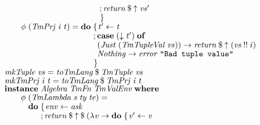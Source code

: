 \documentclass[10pt]{article}
\newcommand{\Conid}[1]{\mathit{#1}}
\newcommand{\Varid}[1]{\mathit{#1}}
\begin{document}
\begin{tabbing}
${\hskip1.00em\relax\hskip2.00em\relax\phantom{\Varid{\phi}\;(\Conid{TmTuple}\;\Varid{vs})\mathrel{=}\mathbf{do}\;\mbox{}};\Varid{return}\mathbin{\$}\Varid{\uparrow}\;\Varid{vs'}}$\\
${\hskip1.00em\relax\hskip2.00em\relax\phantom{\Varid{\phi}\;(\Conid{TmTuple}\;\Varid{vs})\mathrel{=}\mathbf{do}\;\mbox{}}\mskip1.5mu\}}$\\
${}$\\
${\hskip1.00em\relax\hskip2.00em\relax\Varid{\phi}\;(\Conid{TmPrj}\;\Varid{i}\;\Varid{t})\mathrel{=}\mathbf{do}\;\{\mskip1.5mu \Varid{t'}\leftarrow \Varid{t}}$\\
${\hskip1.00em\relax\hskip2.00em\relax\phantom{\Varid{\phi}\;(\Conid{TmPrj}\;\Varid{i}\;\Varid{t})\mathrel{=}\mathbf{do}\;\mbox{}};\mathbf{case}\;(\Varid{\downarrow}\;\Varid{t'})\;\mathbf{of}}$\\
${\hskip1.00em\relax\hskip2.00em\relax\phantom{\Varid{\phi}\;(\Conid{TmPrj}\;\Varid{i}\;\Varid{t})\mathrel{=}\mathbf{do}\;\mbox{}}\phantom{;\mbox{}}(\Conid{Just}\;(\Conid{TmTupleVal}\;\Varid{vs}))\to \Varid{return}\mathbin{\$}\Varid{\uparrow}\;(\Varid{vs}\mathbin{!!}\Varid{i})}$\\
${\hskip1.00em\relax\hskip2.00em\relax\phantom{\Varid{\phi}\;(\Conid{TmPrj}\;\Varid{i}\;\Varid{t})\mathrel{=}\mathbf{do}\;\mbox{}}\phantom{;\mbox{}}\Conid{Nothing}\to \Varid{error}\;\text{\tt \char34 Bad~tuple~value\char34}}$\\
${\hskip1.00em\relax\hskip2.00em\relax\phantom{\Varid{\phi}\;(\Conid{TmPrj}\;\Varid{i}\;\Varid{t})\mathrel{=}\mathbf{do}\;\mbox{}}\mskip1.5mu\}}$\\
${}$\\
${\hskip1.00em\relax\Varid{mkTuple}\;\Varid{vs}\mathrel{=}\Varid{toTmLang}\mathbin{\$}\Conid{TmTuple}\;\Varid{vs}}$\\
${\hskip1.00em\relax\Varid{mkTmPrj}\;\Varid{i}\;\Varid{t}\mathrel{=}\Varid{toTmLang}\mathbin{\$}\Conid{TmPrj}\;\Varid{i}\;\Varid{t}}$\\
${}$\\
${\hskip1.00em\relax\mathbf{instance}\;\Conid{Algebra}\;\Conid{TmFn}\;\Conid{TmValEnv}\;\mathbf{where}}$\\
${\hskip1.00em\relax\hskip2.00em\relax\Varid{\phi}\;(\Conid{TmLambda}\;\Varid{s}\;\Varid{ty}\;\Varid{te})\mathrel{=}}$\\
${\hskip1.00em\relax\hskip2.00em\relax\phantom{\Varid{\phi}\;\mbox{}}\mathbf{do}\;\{\mskip1.5mu \Varid{env}\leftarrow \Varid{ask}}$\\
${\hskip1.00em\relax\hskip2.00em\relax\phantom{\Varid{\phi}\;\mbox{}}\phantom{\mathbf{do}\;\mbox{}};\Varid{return}\mathbin{\$}\Varid{\uparrow}\mathbin{\$}(\lambda \Varid{v}\to \mathbf{do}\;\{\mskip1.5mu \Varid{v'}\leftarrow \Varid{v}}$\\

\end{tabbing}
\end{document}
